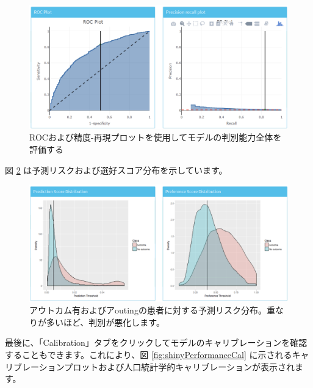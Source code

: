 \documentclass[
  11pt]{book}
\theoremstyle{definition}
\theoremstyle{definition}
\theoremstyle{definition}
\theoremstyle{definition}
\theoremstyle{remark}
\begin{document}
\begin{figure}

{\centering \includegraphics[width=1\linewidth]{images/PatientLevelPrediction/shiny/shinyPerformanceDisc} 

}

\caption{ROCおよび精度-再現プロットを使用してモデルの判別能力全体を評価する}\label{fig:shinyPerformanceDisc}
\end{figure}

図 \ref{fig:shinyPerformanceDist} は予測リスクおよび選好スコア分布を示しています。

\begin{figure}

{\centering \includegraphics[width=1\linewidth]{images/PatientLevelPrediction/shiny/shinyPerformanceDist} 

}

\caption{アウトカム有およびアoutingの患者に対する予測リスク分布。重なりが多いほど、判別が悪化します。}\label{fig:shinyPerformanceDist}
\end{figure}

最後に、「Calibration」タブをクリックしてモデルのキャリブレーションを確認することもできます。これにより、図 \ref{fig:shinyPerformanceCal} に示されるキャリブレーションプロットおよび人口統計学的キャリブレーションが表示されます。
\end{document}

